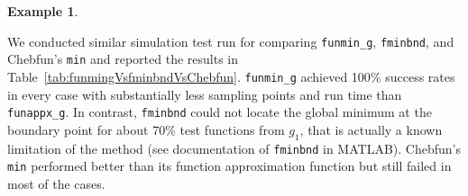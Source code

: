 \documentclass[review]{elsarticle}
\newcommand{\abstol}{\varepsilon}
\theoremstyle{definition}
\newtheorem{exmp}{Example}
\newcommand{\funappxg}{\texttt{funappx\_g}\xspace}
\newcommand{\funming}{\texttt{funmin\_g}\xspace}
\newcommand{\fminbnd}{\texttt{fminbnd}\xspace}
\newcommand{\integralg}{\texttt{integral\_g}\xspace}
\begin{document}
\begin{exmp}
\begin{table}[tb]
{	}
\end{table}
%

We conducted similar simulation test run for comparing \funming, \fminbnd, and
Chebfun's \texttt{min} and reported the results in
Table~\ref{tab:funmingVsfminbndVsChebfun}. \funming{} achieved 100\% success
rates in every case with substantially less sampling points and run time than
\funappxg. In contrast, \fminbnd{} could not locate the global minimum at the
boundary point for about 70\% test functions from $g_1$, that is actually a
known limitation of the method (see documentation of \fminbnd{} in MATLAB).
Chebfun's {\tt min} performed better than its function approximation function
but still failed in most of the cases.

\end{exmp}


\begin{comment}
\begin{exmp}
In this example, we consider the function $f_4(x) = sin(10 \pi x^4) + x$, which
is increasing oscillating over the interval $[0,2]$. We use \funappxg, \funming,
and \integralg to approximate the function, locate its global minimum, and
estimate its integral with $\abstol = 10^{-8}$. With $1,972,359$ points,
\funappxg can approximate $f_4$ uniformly accurate as shown in
Figure~\ref{f4fig}(a). The true global minimum is $(0.6212340312,
-0.3782149854)$ and the absolute approximation error of \funming using
$n=2,022,621$ points is $(1.4\times 10^{-7}, 4.7\times 10^{-11})$. The integral
$\int_{0}^{2} f_4 (x) dx = 2.145517314$ and the approximation error of
\integralg is $4.7\times10^{-10}$ using $4,965,641$ points.

\begin{figure}[bt]
\centering
\texttt{[image: figure/f4\_funappx\_error.eps]} \hspace{-5ex}
\texttt{[image: figure/f4\_funmin\_g.eps]}
\caption{The example $f_4$ with errors of interpolants from \funappxg (left) and
minimum found by \funming (right).}
\label{f4fig}
\end{figure}
\end{exmp}
\end{comment}


\begin{comment}
Our algorithm is readily extensible to the following complex-valued function.
\begin{exmp}
This example is taken from MATLAB's documentation for \texttt{interp1}. Define
the complex valued function $v(x) = 5x + x^2 i$ for $x \in [1,10]$. It is clear
that the real part of $v$ is $5x$ and the imaginary part is $x^2$. We could
apply \funappxg to approximate the two parts separately. However, it is
unnecessary.
\end{exmp}
\end{comment}
\end{document}
